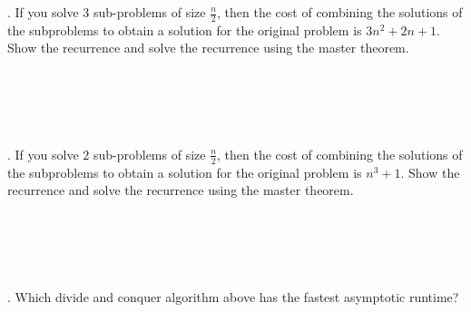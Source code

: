 \documentclass[12pt]{article}
\begin{document}
. If you solve $3$ sub-problems of size $\frac{n}{2}$, then the cost of combining the solutions of the subproblems to obtain a solution for the original problem is $3n^2+2n+1$. Show the recurrence and solve the recurrence using the master theorem.\\\\\\\\\\\\
. If you solve $2$ sub-problems of size $\frac{n}{2}$, then the cost of combining the solutions of the subproblems to obtain a solution for the original problem is $n^3+1$. Show the recurrence and solve the recurrence using the master theorem.\\\\\\\\\\\\
. Which divide and conquer algorithm above has the fastest asymptotic runtime?
\end{document}
